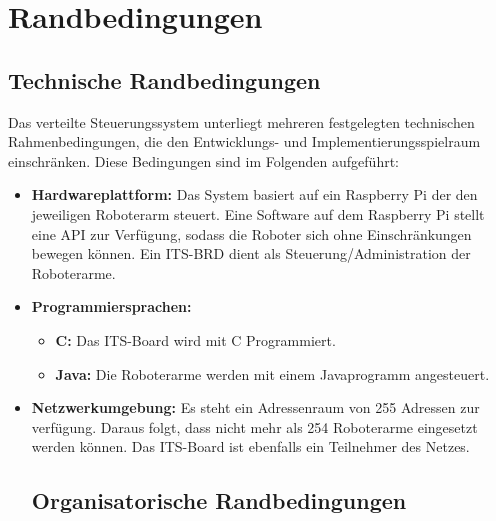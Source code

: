 

\chapter{Randbedingungen}

\section{Technische Randbedingungen}

Das verteilte Steuerungssystem unterliegt mehreren festgelegten technischen Rahmenbedingungen, die den Entwicklungs- und Implementierungsspielraum einschränken. Diese Bedingungen sind im Folgenden aufgeführt:

\begin{itemize}
    \item \textbf{Hardwareplattform:}  Das System basiert auf ein Raspberry Pi der den jeweiligen Roboterarm steuert. Eine Software auf dem Raspberry Pi stellt eine API zur Verfügung, sodass die Roboter sich ohne Einschränkungen bewegen können. %
     Ein ITS-BRD dient als Steuerung/Administration der Roboterarme.
    
    \item \textbf{Programmiersprachen:}  
    \begin{itemize}
        \item \textbf{C:} Das ITS-Board wird mit C Programmiert. 
        \item \textbf{Java:} Die Roboterarme werden mit einem Javaprogramm angesteuert.
    \end{itemize}
    \item \textbf{Netzwerkumgebung:} Es steht ein Adressenraum von 255 Adressen zur verfügung. Daraus folgt, dass nicht mehr als 254 Roboterarme eingesetzt werden können. Das ITS-Board ist ebenfalls ein Teilnehmer des Netzes.

\section{Organisatorische Randbedingungen}
\begin{itemize}


\end{itemize}
\end{itemize}
